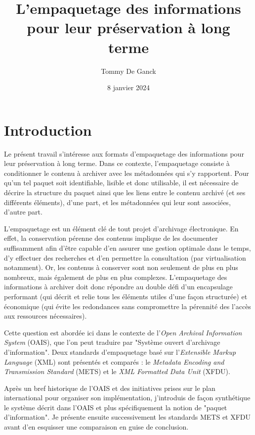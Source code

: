 \documentclass[12pt,a4paper]{article} %
\title{L'empaquetage des informations pour leur préservation à long terme} %
\author{Tommy De Ganck} %
\date{8 janvier 2024} %
\begin{document}

\maketitle %
	

\section{Introduction} %
Le présent travail s'intéresse aux formats d'empaquetage des informations pour leur préservation à long terme. Dans ce contexte, l'empaquetage consiste à conditionner le contenu à archiver avec les métadonnées qui s'y rapportent. Pour qu'un tel paquet soit identifiable, lisible et donc utilisable, il est nécessaire de décrire la structure du paquet ainsi que les liens entre le contenu archivé (et ses différents éléments), d'une part, et les métadonnées qui leur sont associées, d'autre part. 

L'empaquetage est un élément clé de tout projet d'archivage électronique. En effet, la conservation pérenne des contenus implique de les documenter suffisamment afin d'être capable d'en assurer une gestion optimale dans le temps, d'y effectuer des recherches et d'en permettre la consultation (par virtualisation notamment). Or, les contenus à conserver sont non seulement de plus en plus nombreux, mais également de plus en plus complexes. L'empaquetage des informations à archiver doit donc répondre au double défi d'un encapsulage performant (qui décrit et relie tous les éléments utiles d'une façon structurée) et économique (qui évite les redondances sans compromettre la pérennité des l'accès aux ressources nécessaires). 

Cette question est abordée ici dans le contexte de l'\textit{Open Archival Information System} (OAIS), que l'on peut traduire par "Système ouvert d'archivage d'information". Deux standards d'empaquetage basé sur l'\textit{Extensible Markup Language} (XML) sont présentés et comparés : le \textit{Metadata Encoding and Transmission Standard} (METS) et le \textit{XML Formatted Data Unit} (XFDU). 

Après un bref historique de l'OAIS et des initiatives prises sur le plan international pour organiser son implémentation, j'introduis de façon synthétique le système décrit dans l'OAIS et plus spécifiquement la notion de "paquet d'information". Je présente ensuite successivement les standards METS et XFDU avant d'en esquisser une comparaison en guise de conclusion. 
\end{document}
